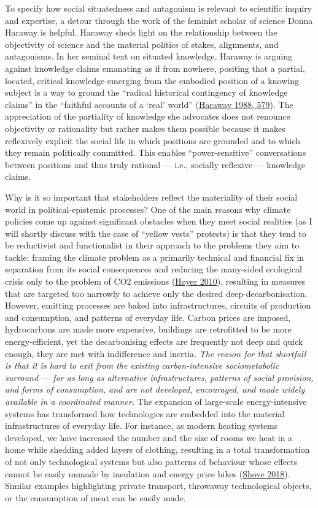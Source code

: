 \documentclass[a4paper, nobind]{templates/ociamthesis}
\begin{document}
To specify how social situatedness and antagonism is relevant to scientific inquiry and expertise, a detour through the work of the feminist scholar of science Donna Haraway is helpful. Haraway sheds light on the relationship between the objectivity of science and the material politics of stakes, alignments, and antagonisms. In her seminal text on situated knowledge, Haraway is arguing against knowledge claims emanating as if from nowhere, positing that a partial, located, critical knowledge emerging from the embodied position of a knowing subject is a way to ground the ``radical historical contingency of knowledge claims'' in the ``faithful accounts of a `real' world'' (\protect\hyperlink{ref-haraway_situated_1988}{Haraway 1988, 579}). The appreciation of the partiality of knowledge she advocates does not renounce objectivity or rationality but rather makes them possible because it makes reflexively explicit the social life in which positions are grounded and to which they remain politically committed. This enables ``power-sensitive'' conversations between positions and thus truly rational --- i.e., socially reflexive --- knowledge claims.

Why is it so important that stakeholders reflect the materiality of their social world in political-epistemic processes? One of the main reasons why climate policies come up against significant obstacles when they meet social realities (as I will shortly discuss with the case of ``yellow vests'' protests) is that they tend to be reductivist and functionalist in their approach to the problems they aim to tackle: framing the climate problem as a primarily technical and financial fix in separation from its social consequences and reducing the many-sided ecological crisis only to the problem of CO2 emissions (\protect\hyperlink{ref-hoyer_seven_2010}{Høyer 2010}), resulting in measures that are targeted too narrowly to achieve only the desired deep-decarbonisation. However, emitting processes are baked into infrastructures, circuits of production and consumption, and patterns of everyday life. Carbon prices are imposed, hydrocarbons are made more expensive, buildings are retrofitted to be more energy-efficient, yet the decarbonising effects are frequently not deep and quick enough, they are met with indifference and inertia. \emph{The reason for that shortfall is that it is hard to exit from the existing carbon-intensive sociometabolic surround --- for as long as alternative infrastructures, patterns of social provision, and forms of consumption, and are not developed, encouraged, and made widely available in a coordinated manner.} The expansion of large-scale energy-intensive systems has transformed how technologies are embedded into the material infrastructures of everyday life. For instance, as modern heating systems developed, we have increased the number and the size of rooms we heat in a home while shedding added layers of clothing, resulting in a total transformation of not only technological systems but also patterns of behaviour whose effects cannot be easily unmade by insulation and energy price hikes (\protect\hyperlink{ref-shove_what_2018}{Shove 2018}). Similar examples highlighting private transport, throwaway technological objects, or the consumption of meat can be easily made.
\end{document}
